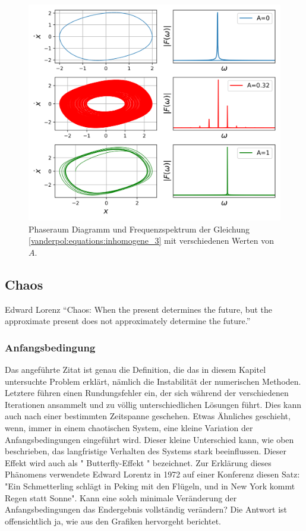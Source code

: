 \begin{figure}
	\centering
	\includegraphics[width=\textwidth]{papers/vanderpol/figures/fft_plot.png}
	\caption{Phaseraum Diagramm und Frequenzspektrum der Gleichung \ref{vanderpol:equations:inhomogene_3} mit verschiedenen Werten von $A$.\label{vanderpol:figures:fft}}
\end{figure}
\subsection{Chaos}
\label{vanderpol:subsection:chaos}
 
\begin{cquote}[30pt]{Edward Lorenz}
``Chaos: When the present determines the future, but the approximate present does not approximately determine the future.''
\end{cquote}
 
\subsubsection{Anfangsbedingung}
\label{vanderpol:subsubsection:anfangsbedingung}
 
Das angeführte Zitat ist genau die Definition, die das in diesem Kapitel untersuchte Problem erklärt, nämlich die Instabilität der numerischen Methoden. Letztere führen einen Rundungsfehler ein, der sich während der verschiedenen Iterationen ansammelt und zu völlig unterschiedlichen Lösungen führt. Dies kann auch nach einer bestimmten Zeitspanne geschehen.
Etwas Ähnliches geschieht, wenn, immer in einem chaotischen System, eine kleine Variation der Anfangsbedingungen eingeführt wird.  Dieser kleine Unterschied kann, wie oben beschrieben, das langfristige Verhalten des Systems stark beeinflussen. Dieser Effekt wird auch als " Butterfly-Effekt " bezeichnet. Zur Erklärung dieses Phänomens verwendete Edward Lorentz in 1972 auf einer Konferenz diesen Satz: "Ein Schmetterling schlägt in Peking mit den Flügeln, und in New York kommt Regen statt Sonne". Kann eine solch minimale Veränderung der Anfangsbedingungen das Endergebnis vollständig verändern? Die Antwort ist offensichtlich ja, wie aus den Grafiken hervorgeht berichtet.





